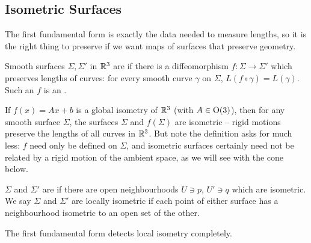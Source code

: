\documentclass[a4paper]{scrartcl}
\begin{document}
\subsection{Isometric Surfaces}

The first fundamental form is exactly the data needed to measure lengths, so it is the right thing to preserve if we want maps of surfaces that preserve geometry.

\begin{definition}
    Smooth surfaces $\Sigma, \Sigma'$ in $\mathbb{R}^3$ are  if there is a diffeomorphism $f: \Sigma \rightarrow \Sigma'$ which preserves lengths of curves: for every smooth curve $\gamma$ on $\Sigma$, $L(f \circ \gamma) = L(\gamma)$. Such an $f$ is an .
\end{definition}

\begin{example}
    If $f(x) = Ax + b$ is a global isometry of $\mathbb{R}^3$ (with $A \in \operatorname{O}(3)$), then for any smooth surface $\Sigma$, the surfaces $\Sigma$ and $f(\Sigma)$ are isometric -- rigid motions preserve the lengths of all curves in $\mathbb{R}^3$. But note the definition asks for much less: $f$ need only be defined on $\Sigma$, and isometric surfaces certainly need not be related by a rigid motion of the ambient space, as we will see with the cone below.
\end{example}

\begin{definition}
    $\Sigma$ and $\Sigma'$ are  if there are open neighbourhoods $U \ni p$, $U' \ni q$ which are isometric. We say $\Sigma$ and $\Sigma'$ are locally isometric if each point of either surface has a neighbourhood isometric to an open set of the other.
\end{definition}

The first fundamental form detects local isometry completely.
\end{document}
